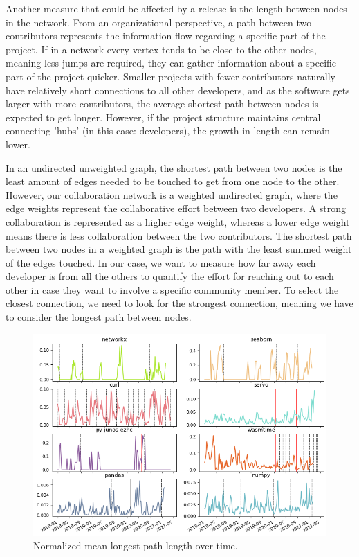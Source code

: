 Another measure that could be affected by a release is the length between nodes in the network. From an organizational perspective, a path between two contributors represents the information flow regarding a specific part of the project. If in a network every vertex tends to be close to the other nodes, meaning less jumps are required, they can gather information about a specific part of the project quicker. Smaller projects with fewer contributors naturally have relatively short connections to all other developers, and as the software gets larger with more contributors, the average shortest path between nodes is expected to get longer. However, if the project structure maintains central connecting 'hubs' (in this case: developers), the growth in length can remain lower.

In an undirected unweighted graph, the shortest path between two nodes is the least amount of edges needed to be touched to get from one node to the other. However, our collaboration network is a weighted undirected graph, where the edge weights represent the collaborative effort between two developers. A strong collaboration is represented as a higher edge weight, whereas a lower edge weight means there is less collaboration between the two contributors. The shortest path between two nodes in a weighted graph is the path with the least summed weight of the edges touched. In our case, we want to measure how far away each developer is from all the others to quantify the effort for reaching out to each other in case they want to involve a specific community member. To select the closest connection, we need to look for the strongest connection, meaning we have to consider the longest path between nodes.

\begin{figure}[!htbp]
    \centering
    \includegraphics[width=\textwidth]{figures/qualitative/mean_path_length/path_length_all_normalized.png}
    \caption{Normalized mean longest path length over time.}
    \label{fig:mean_path}
\end{figure}

